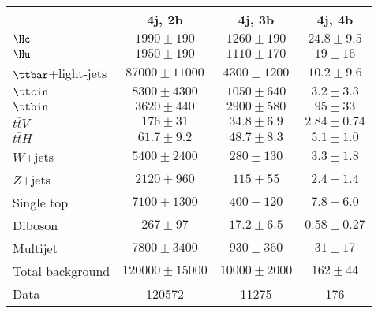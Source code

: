 \begin{table}[htbp]
\small
\begin{center}
\begin{tabular}{l*{3}{c}}
\hline\hline
 & 4j, 2b & 4j, 3b & 4j, 4b \\
\hline
$\Hc$ & $ 1990 \pm 190 $ &   $ 1260 \pm 190 $ &   $ 24.8 \pm 9.5 $ \\
$\Hu$ & $ 1950 \pm 190 $ &   $ 1110 \pm 170 $ &   $ 19 \pm 16 $ \\ 
\hline
$\ttbar$+light-jets & $ 87000 \pm 11000 $ &   $ 4300 \pm 1200 $ &   $ 10.2 \pm 9.6 $ \\ 
$\ttcin$ & $ 8300 \pm 4300 $ &   $ 1050 \pm 640 $ &   $ 3.2 \pm 3.3 $ \\ 
$\ttbin$ & $ 3620 \pm 440 $ &   $ 2900 \pm 580 $ &   $ 95 \pm 33 $ \\ 
$t\bar{t}V$ & $ 176 \pm 31 $ &   $ 34.8 \pm 6.9 $ &   $ 2.84 \pm 0.74 $ \\ 
$t\bar{t}H$ & $ 61.7 \pm 9.2 $ &   $ 48.7 \pm 8.3 $ &   $ 5.1 \pm 1.0 $ \\
$W$+jets & $ 5400 \pm 2400 $ &   $ 280 \pm 130 $ &   $ 3.3 \pm 1.8 $ \\ 
$Z$+jets & $ 2120 \pm 960 $ &   $ 115 \pm 55 $ &   $ 2.4 \pm 1.4 $ \\ 
Single top & $ 7100 \pm 1300 $ &   $ 400 \pm 120 $ &   $ 7.8 \pm 6.0 $ \\ 
Diboson & $ 267 \pm 97 $ &   $ 17.2 \pm 6.5 $ &   $ 0.58 \pm 0.27 $ \\ 
Multijet & $ 7800 \pm 3400 $ &   $ 930 \pm 360 $ &   $ 31 \pm 17 $ \\
\hline
Total background & $ 120000 \pm 15000 $ &   $ 10000 \pm 2000 $ &   $ 162 \pm 44 $ \\ 
\hline
Data & 120572  & 11275  & 176  \\
\hline\hline    
\end{tabular}
\vspace{0.2cm}


\end{center}
\end{table}
